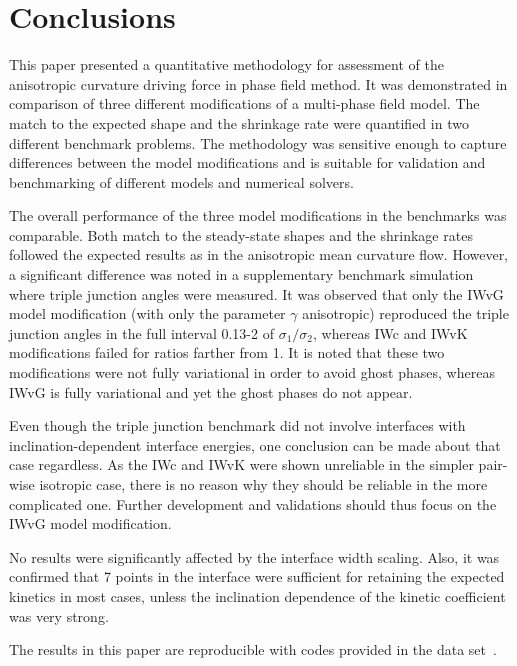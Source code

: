 \section{Conclusions}

This paper presented a quantitative methodology for assessment of the anisotropic curvature driving force in phase field method. It was demonstrated in comparison of three different modifications of a multi-phase field model. The match to the expected shape and the shrinkage rate were quantified in two different benchmark problems. The methodology was sensitive enough to capture differences between the model modifications and is suitable for validation and benchmarking of different models and numerical solvers.

The overall performance of the three model modifications in the benchmarks was comparable. Both match to the steady-state shapes and the shrinkage rates followed the expected results as in the anisotropic mean curvature flow. However, a significant difference was noted in a supplementary benchmark simulation where triple junction angles were measured. It was observed that only the IWvG model modification (with only the parameter $\gamma$ anisotropic) reproduced the triple junction angles in the full interval 0.13-2 of $\sigma_1/\sigma_2$, whereas IWc and IWvK modifications failed for ratios farther from 1. It is noted that these two modifications were not fully variational in order to avoid ghost phases, whereas IWvG is fully variational and yet the ghost phases do not appear.

Even though the triple junction benchmark did not involve interfaces with inclination-dependent interface energies, one conclusion can be made about that case regardless. As the IWc and IWvK were shown unreliable in the simpler pair-wise isotropic case, there is no reason why they should be reliable in the more complicated one. Further development and validations should thus focus on the IWvG model modification.


No results were significantly affected by the interface width scaling. Also, it was confirmed that 7 points in the interface were sufficient for retaining the expected kinetics in most cases, unless the inclination dependence of the kinetic coefficient was very strong.

The results in this paper are reproducible with codes provided in the data set~\cite{Minar2022dataset}.


	
	
